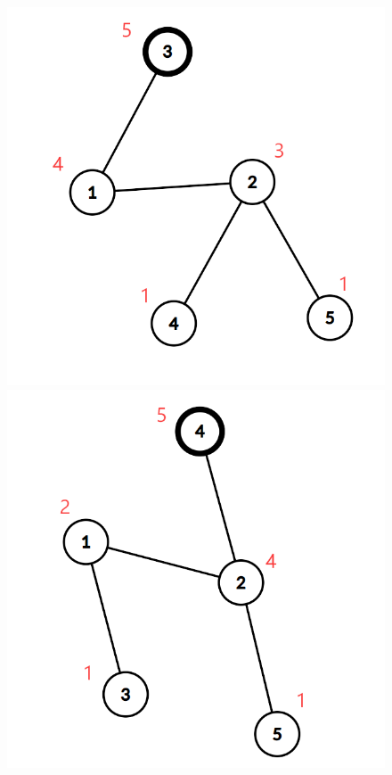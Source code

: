 \documentclass{ctpro}
\begin{document}
\begin{figure}
	\includegraphics[scale=0.14]{images/D_3.png}
	\includegraphics[scale=0.14]{images/D_4.png}

\end{figure}
\end{document}
